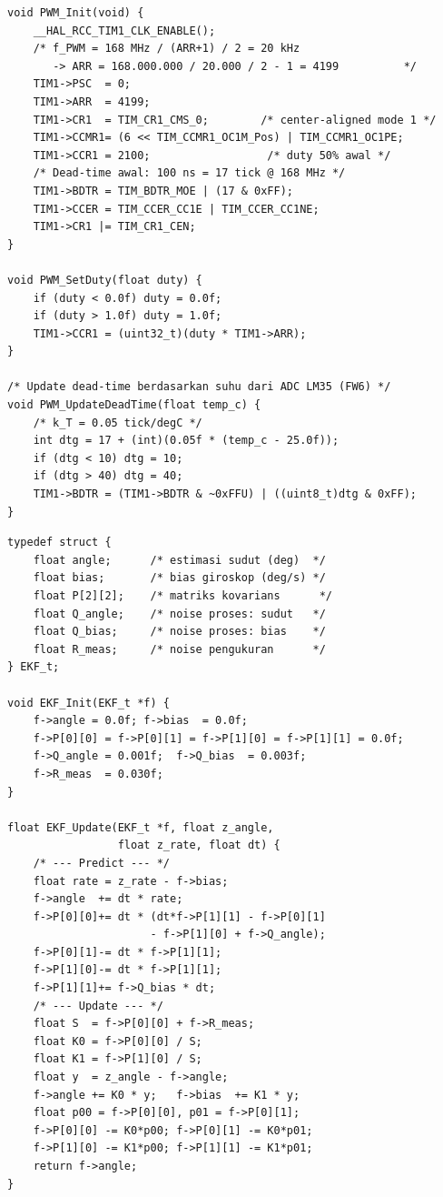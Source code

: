 \documentclass[12pt,a4paper]{article}
\begin{document}
\begin{lstlisting}[style=cstyle,
  caption={Inisialisasi TIM1 PWM center-aligned 20 kHz + dead-time adaptif (FW6).}]
void PWM_Init(void) {
    __HAL_RCC_TIM1_CLK_ENABLE();
    /* f_PWM = 168 MHz / (ARR+1) / 2 = 20 kHz
       -> ARR = 168.000.000 / 20.000 / 2 - 1 = 4199          */
    TIM1->PSC  = 0;
    TIM1->ARR  = 4199;
    TIM1->CR1  = TIM_CR1_CMS_0;        /* center-aligned mode 1 */
    TIM1->CCMR1= (6 << TIM_CCMR1_OC1M_Pos) | TIM_CCMR1_OC1PE;
    TIM1->CCR1 = 2100;                  /* duty 50% awal */
    /* Dead-time awal: 100 ns = 17 tick @ 168 MHz */
    TIM1->BDTR = TIM_BDTR_MOE | (17 & 0xFF);
    TIM1->CCER = TIM_CCER_CC1E | TIM_CCER_CC1NE;
    TIM1->CR1 |= TIM_CR1_CEN;
}

void PWM_SetDuty(float duty) {
    if (duty < 0.0f) duty = 0.0f;
    if (duty > 1.0f) duty = 1.0f;
    TIM1->CCR1 = (uint32_t)(duty * TIM1->ARR);
}

/* Update dead-time berdasarkan suhu dari ADC LM35 (FW6) */
void PWM_UpdateDeadTime(float temp_c) {
    /* k_T = 0.05 tick/degC */
    int dtg = 17 + (int)(0.05f * (temp_c - 25.0f));
    if (dtg < 10) dtg = 10;
    if (dtg > 40) dtg = 40;
    TIM1->BDTR = (TIM1->BDTR & ~0xFFU) | ((uint8_t)dtg & 0xFF);
}
\end{lstlisting}

\begin{lstlisting}[style=cstyle,
  caption={Extended Kalman Filter 2-state untuk estimasi sudut IMU (FW13).}]
typedef struct {
    float angle;      /* estimasi sudut (deg)  */
    float bias;       /* bias giroskop (deg/s) */
    float P[2][2];    /* matriks kovarians      */
    float Q_angle;    /* noise proses: sudut   */
    float Q_bias;     /* noise proses: bias    */
    float R_meas;     /* noise pengukuran      */
} EKF_t;

void EKF_Init(EKF_t *f) {
    f->angle = 0.0f; f->bias  = 0.0f;
    f->P[0][0] = f->P[0][1] = f->P[1][0] = f->P[1][1] = 0.0f;
    f->Q_angle = 0.001f;  f->Q_bias  = 0.003f;
    f->R_meas  = 0.030f;
}

float EKF_Update(EKF_t *f, float z_angle,
                 float z_rate, float dt) {
    /* --- Predict --- */
    float rate = z_rate - f->bias;
    f->angle  += dt * rate;
    f->P[0][0]+= dt * (dt*f->P[1][1] - f->P[0][1]
                      - f->P[1][0] + f->Q_angle);
    f->P[0][1]-= dt * f->P[1][1];
    f->P[1][0]-= dt * f->P[1][1];
    f->P[1][1]+= f->Q_bias * dt;
    /* --- Update --- */
    float S  = f->P[0][0] + f->R_meas;
    float K0 = f->P[0][0] / S;
    float K1 = f->P[1][0] / S;
    float y  = z_angle - f->angle;
    f->angle += K0 * y;   f->bias  += K1 * y;
    float p00 = f->P[0][0], p01 = f->P[0][1];
    f->P[0][0] -= K0*p00; f->P[0][1] -= K0*p01;
    f->P[1][0] -= K1*p00; f->P[1][1] -= K1*p01;
    return f->angle;
}
\end{lstlisting}
\end{document}
